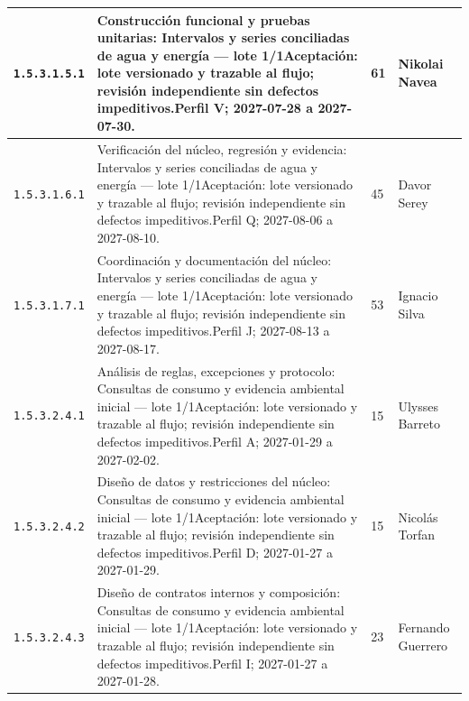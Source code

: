 \begin{longtable}{L{29mm}L{80mm}R{12mm}L{28mm}}
\texttt{1.\allowbreak{}5.\allowbreak{}3.\allowbreak{}1.\allowbreak{}5.\allowbreak{}1} & Construcción funcional y pruebas unitarias: Intervalos y series conciliadas de agua y energía — lote 1/1\newline Aceptación: lote versionado y trazable al flujo; revisión independiente sin defectos impeditivos.\newline Perfil V; 2027-07-28 a 2027-07-30. & 61 & Nikolai Navea\\\hline
\texttt{1.\allowbreak{}5.\allowbreak{}3.\allowbreak{}1.\allowbreak{}6.\allowbreak{}1} & Verificación del núcleo, regresión y evidencia: Intervalos y series conciliadas de agua y energía — lote 1/1\newline Aceptación: lote versionado y trazable al flujo; revisión independiente sin defectos impeditivos.\newline Perfil Q; 2027-08-06 a 2027-08-10. & 45 & Davor Serey\\\hline
\texttt{1.\allowbreak{}5.\allowbreak{}3.\allowbreak{}1.\allowbreak{}7.\allowbreak{}1} & Coordinación y documentación del núcleo: Intervalos y series conciliadas de agua y energía — lote 1/1\newline Aceptación: lote versionado y trazable al flujo; revisión independiente sin defectos impeditivos.\newline Perfil J; 2027-08-13 a 2027-08-17. & 53 & Ignacio Silva\\\hline
\texttt{1.\allowbreak{}5.\allowbreak{}3.\allowbreak{}2.\allowbreak{}4.\allowbreak{}1} & Análisis de reglas, excepciones y protocolo: Consultas de consumo y evidencia ambiental inicial — lote 1/1\newline Aceptación: lote versionado y trazable al flujo; revisión independiente sin defectos impeditivos.\newline Perfil A; 2027-01-29 a 2027-02-02. & 15 & Ulysses Barreto\\\hline
\texttt{1.\allowbreak{}5.\allowbreak{}3.\allowbreak{}2.\allowbreak{}4.\allowbreak{}2} & Diseño de datos y restricciones del núcleo: Consultas de consumo y evidencia ambiental inicial — lote 1/1\newline Aceptación: lote versionado y trazable al flujo; revisión independiente sin defectos impeditivos.\newline Perfil D; 2027-01-27 a 2027-01-29. & 15 & Nicolás Torfan\\\hline
\texttt{1.\allowbreak{}5.\allowbreak{}3.\allowbreak{}2.\allowbreak{}4.\allowbreak{}3} & Diseño de contratos internos y composición: Consultas de consumo y evidencia ambiental inicial — lote 1/1\newline Aceptación: lote versionado y trazable al flujo; revisión independiente sin defectos impeditivos.\newline Perfil I; 2027-01-27 a 2027-01-28. & 23 & Fernando Guerrero\\\hline

\end{longtable}
